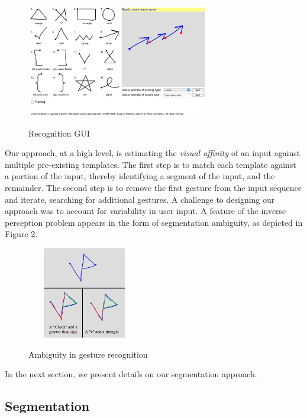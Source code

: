 \documentclass[twoside]{article}
\begin{document}
\begin{multicols}{2}
\begin{figure}[H]
	\centering
	\includegraphics[height=5cm, width=8cm]{Images/GUI.png}
	\label{fig1}
	\caption{Recognition GUI}
\end{figure}
  
Our approach, at a high level, is estimating the \emph{visual affinity} of an 
input against multiple pre-existing templates. The first step
is to match each template against a portion of the input, thereby identifying a
segment of the input, and the remainder. The second step is to remove the first
gesture from the input sequence and iterate, searching for additional gestures.
A challenge to designing our approach was to account for variability in user
input. A feature of the inverse perception problem appears in the form
of segmentation ambiguity, as depicted in Figure 2.

\begin{figure}[H]
	\centering
	\includegraphics[height=4cm, width=5cm]{Images/Ambiguity1.png}
	\label{fig2}
	\caption{Ambiguity in gesture recognition}
\end{figure}

In the next section, we present details on our segmentation approach.

\subsection*{Segmentation}


\end{multicols}
\end{document}
